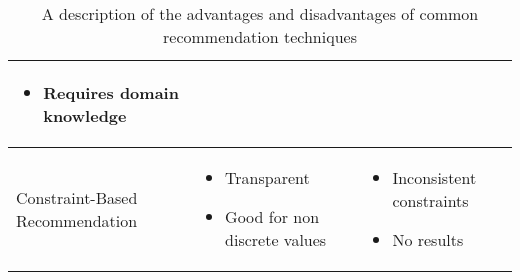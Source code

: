 \begin{table}
\begin{center}
\begin{tabularx}{\columnwidth}{X|X|X}
\begin{itemize}
                    \item Requires domain knowledge
                \end{itemize} \\
            \hline
            Constraint-Based Recommendation 
            &   \begin{itemize}
                    \item Transparent
                    \item Good for non discrete values
                \end{itemize}
            &   \begin{itemize}
                    \item Inconsistent constraints
                    \item No results
                \end{itemize} \\ 
        \end{tabularx}
        \caption{A description of the advantages and disadvantages of common recommendation techniques}
        \label{tab:RecommenderComparison}
    \end{center}
\end{table}

\FloatBarrier
